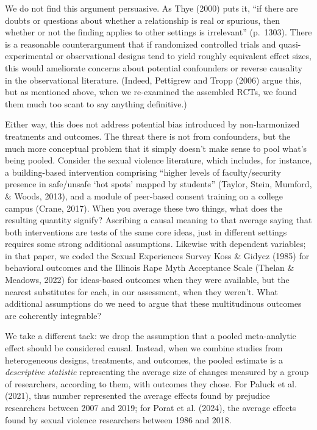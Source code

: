 \documentclass[
  ,jou]{apa6}
\begin{document}
We do not find this argument persuasive. As Thye (2000) puts it, ``if there are doubts or questions about whether a relationship is real or spurious, then whether or not the finding applies to other settings is irrelevant'' (p.~1303). There is a reasonable counterargument that if randomized controlled trials and quasi-experimental or observational designs tend to yield roughly equivalent effect sizes, this would ameliorate concerns about potential confounders or reverse causality in the observational literature. (Indeed, Pettigrew and Tropp (2006) argue this, but as mentioned above, when we re-examined the assembled RCTs, we found them much too scant to say anything definitive.)

Either way, this does not address potential bias introduced by non-harmonized treatments and outcomes. The threat there is not from confounders, but the much more conceptual problem that it simply doesn't make sense to pool what's being pooled. Consider the sexual violence literature, which includes, for instance, a building-based intervention comprising ``higher levels of faculty/security presence in safe/unsafe `hot spots' mapped by students'' (Taylor, Stein, Mumford, \& Woods, 2013), and a module of peer-based consent training on a college campus (Crane, 2017). When you average these two things, what does the resulting quantity signify? Ascribing a causal meaning to that average \textemdash saying that both interventions are tests of the same core ideas, just in different settings \textemdash requires some strong additional assumptions. Likewise with dependent variables; in that paper, we coded the Sexual Experiences Survey Koss \& Gidycz (1985) for behavioral outcomes and the Illinois Rape Myth Acceptance Scale (Thelan \& Meadows, 2022) for ideas-based outcomes when they were available, but the nearest substitutes for each, in our assessment, when they weren't. What additional assumptions do we need to argue that these multitudinous outcomes are coherently integrable?

We take a different tack: we drop the assumption that a pooled meta-analytic effect should be considered causal. Instead, when we combine studies from heterogeneous designs, treatments, and outcomes, the pooled estimate is a \emph{descriptive statistic} representing the average size of changes measured by a group of researchers, according to them, with outcomes they chose. For Paluck et al. (2021), thus number represented the average effects found by prejudice researchers between 2007 and 2019; for Porat et al. (2024), the average effects found by sexual violence researchers between 1986 and 2018.
\end{document}
